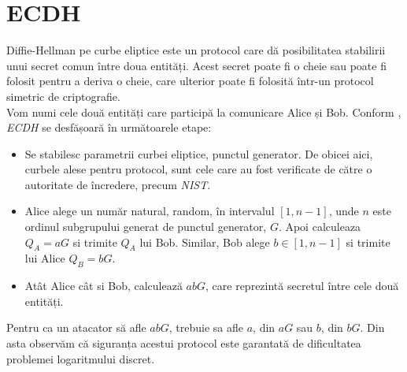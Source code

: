 
\section{ECDH}

Diffie-Hellman pe curbe eliptice este un protocol care dă posibilitatea stabilirii unui secret comun între doua entități. Acest secret poate fi o cheie sau poate fi folosit pentru a deriva o cheie, care ulterior poate fi folosită într-un protocol simetric de criptografie. \\
Vom numi cele două entități care participă la comunicare Alice și Bob. Conform \cite{ecdlp3}, \textit{ECDH} se desfășoară în următoarele etape:

\begin{itemize}
\item Se stabilesc parametrii curbei eliptice, punctul generator. De obicei aici, curbele alese pentru protocol, sunt cele care au fost verificate de către o autoritate de încredere, precum \textit{NIST}.
\item Alice alege un număr natural, random, în intervalul $[1, n-1]$, unde $n$ este ordinul subgrupului generat de punctul generator, $G$. Apoi calculeaza $Q_A = aG$ si trimite $Q_A$ lui Bob. Similar, Bob alege $b\in [1, n-1]$ si trimite lui Alice $Q_B = bG$.
\item Atât Alice cât si Bob, calculează $abG$, care reprezintă secretul între cele două entități.
\end{itemize}

\begin{obs}
Pentru ca un atacator să afle $abG$, trebuie sa afle $a$, din $aG$ sau $b$, din $bG$. Din asta observăm că siguranța acestui protocol este garantată de dificultatea problemei logaritmului discret. 
\end{obs}

